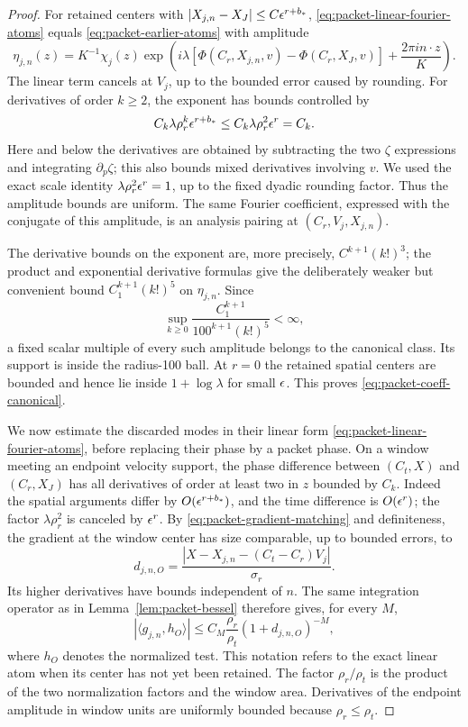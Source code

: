 \begin{proof}
For retained centers with \(|X_{j,n}-X_J|\le C\epsilon^{r+b_*}\),
\eqref{eq:packet-linear-fourier-atoms} equals
\eqref{eq:packet-earlier-atoms} with amplitude
\[
 \eta_{j,n}(z)=K^{-1}\chi_j(z)
 \exp\left(i\lambda[\Phi(C_r,X_{j,n},v)-\Phi(C_r,X_J,v)]
                    +\frac{2\pi i n\cdot z}{K}\right).
\]
The linear term cancels at \(V_j\), up to the bounded error caused
by rounding.  For derivatives of order \(k\ge2\), the exponent
has bounds controlled by
\[
 C_k\lambda\rho_r^k\epsilon^{r+b_*}
 \le C_k\lambda\rho_r^2\epsilon^r=C_k.
\]
Here and below the derivatives are obtained by subtracting the two
\(\zeta\) expressions and integrating \(\partial_p\zeta\);
this also bounds mixed derivatives involving \(v\).
We used the exact scale identity
\(\lambda\rho_r^2\epsilon^r=1\), up to the fixed dyadic rounding
factor.  Thus the amplitude bounds are uniform.
The same Fourier coefficient, expressed with the conjugate of this
amplitude, is an analysis pairing at \((C_r,V_j,X_{j,n})\).

The derivative bounds on the exponent are, more precisely,
\(C^{k+1}(k!)^3\); the product and exponential derivative formulas
give the deliberately weaker but convenient bound
\(C_1^{k+1}(k!)^5\) on \(\eta_{j,n}\).
Since
\[
 \sup_{k\ge0}\frac{C_1^{k+1}}{100^{k+1}(k!)^5}<\infty,
\]
a fixed scalar multiple of every such amplitude belongs to the
canonical class.  Its support is inside the radius-100 ball.
At \(r=0\) the retained spatial centers are bounded and hence lie
inside \(1+\log\lambda\) for small \(\epsilon\).
This proves \eqref{eq:packet-coeff-canonical}.

We now estimate the discarded modes in their linear form
\eqref{eq:packet-linear-fourier-atoms}, before replacing their phase
by a packet phase.  On a window meeting an endpoint velocity support,
the phase difference between \((C_t,X)\) and \((C_r,X_J)\)
has all derivatives of order at least two in \(z\) bounded by
\(C_k\).  Indeed the spatial arguments differ by
\(O(\epsilon^{r+b_*})\), and the time difference is \(O(\epsilon^r)\);
the factor \(\lambda\rho_r^2\) is canceled by \(\epsilon^r\).
By \eqref{eq:packet-gradient-matching} and definiteness, the gradient
at the window center has size comparable, up to bounded errors, to
\[
 d_{j,n,O}=
 \frac{|X-X_{j,n}-(C_t-C_r)V_j|}{\sigma_r}.
\]
Its higher derivatives have bounds independent of \(n\).  The same
integration operator as in Lemma~\ref{lem:packet-bessel} therefore
gives, for every \(M\),
\begin{equation}
 |\langle g_{j,n},h_O\rangle|
 \le C_M\frac{\rho_r}{\rho_t}(1+d_{j,n,O})^{-M},
 \label{eq:packet-mixed-gram}
\end{equation}
where \(h_O\) denotes the normalized test.  This notation refers
to the exact linear atom when its center has not yet been retained.
The factor \(\rho_r/\rho_t\) is the product of the two normalization
factors and the window area.  Derivatives of the endpoint amplitude
in window units are uniformly bounded because \(\rho_r\le\rho_t\).


\end{proof}
